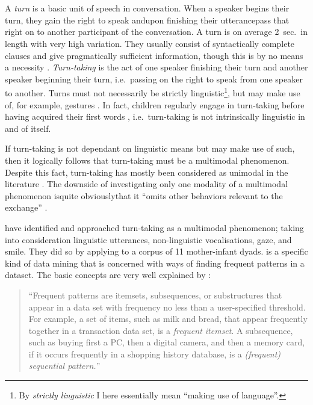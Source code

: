 
\chapter{\introduction}
\label{ch:introduction}
A \emph{turn} is a basic unit of speech in conversation. When a speaker begins their turn, they gain the right to speak and\dash upon finishing their utterance\dash pass that right on to another participant of the conversation. A turn is on average 2~sec.\ in length with very high variation. They usually consist of syntactically complete clauses and give pragmatically sufficient information, though this is by no means a necessity \citep[]{levinson16}.
\emph{Turn-taking} is the act of one speaker finishing their turn and another speaker beginning their turn, i.e.\ passing on the right to speak from one speaker to another. Turns must not necessarily be strictly linguistic\footnote{By \emph{strictly linguistic} I here essentially mean ``making use of language''.}, but may make use of, for example, gestures \citep{missingsource}. In fact, children regularly engage in turn-taking before having acquired their first words \citep[]{casillas16}, i.e.\ turn-taking is not intrinsically linguistic in and of itself.

If turn-taking is not dependant on linguistic means but may make use of such, then it logically follows that turn-taking must be a multimodal phenomenon. Despite this fact, turn-taking has mostly been considered as unimodal in the literature \citep[]{rohlfing18}. The downside of investigating only one modality of a multimodal phenomenon is\dash quite obviously\dash that it ``omits other behaviors relevant to the exchange'' \citep[]{rohlfing18}.

\citet{rohlfing18} have identified and approached turn-taking as a multimodal phenomenon; taking into consideration linguistic utterances, non-linguistic vocalisations, gaze, and smile. They did so by applying \fpmlower to a corpus of 11 mother-infant dyads. \fpmsentence is a specific kind of data mining that is concerned with ways of finding frequent patterns in a dataset. The basic concepts are very well explained by \citet{han07}:

\begin{quote}
``Frequent patterns are itemsets, subsequences, or substructures that appear in a data set with frequency no less than a user-specified threshold. For example, a set of items, such as milk and bread, that appear frequently together in a transaction data set, is a \emph{frequent itemset}. A subsequence, such as buying first a PC, then a digital camera, and then a memory card, if it occurs frequently in a shopping history database, is a \emph{(frequent) sequential pattern.}'' \hfill \citep[]{han07}
\end{quote}

